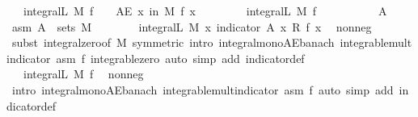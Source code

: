 \begin{isabellebody}
\ \ \ {\isachardoublequoteopen}integral\isactrlsup L\ M\ f\ {\isacharequal}{\kern0pt}\ {}\ {\isasymlongleftrightarrow}\ {\isacharparenleft}{\kern0pt}AE\ x\ in\ M{\isachardot}{\kern0pt}\ f\ x\ {\isacharequal}{\kern0pt}\ {}{\isacharparenright}{\kern0pt}{\isachardoublequoteclose}\isanewline
%
\isadelimproof
%
\endisadelimproof
%
\isatagproof
{}\isamarkupfalse%
\ \isanewline
\ \ \isamarkupfalse%
\ {\isacharasterisk}{\kern0pt}{\isacharcolon}{\kern0pt}\ {\isachardoublequoteopen}integral\isactrlsup L\ M\ f\ {\isacharequal}{\kern0pt}\ {}{\isachardoublequoteclose}\isanewline
\ \ \isacommand{{\isacharbraceleft}{\kern0pt}}\isamarkupfalse%
\isanewline
\ \ \ \ \isamarkupfalse%
\ A\ \isamarkupfalse%
\ asm{\isacharcolon}{\kern0pt}\ {\isachardoublequoteopen}A\ {\isasymin}\ sets\ M{\isachardoublequoteclose}\isanewline
\ \ \ \ \isamarkupfalse%
\ {\isachardoublequoteopen}{}\ {\isasymle}\ integral\isactrlsup L\ M\ {\isacharparenleft}{\kern0pt}{\isasymlambda}x{\isachardot}{\kern0pt}\ indicator\ A\ x\ {\isacharasterisk}{\kern0pt}\isactrlsub R\ f\ x{\isacharparenright}{\kern0pt}{\isachardoublequoteclose}\ \isamarkupfalse%
\ nonneg\ \isamarkupfalse%
\ {\isacharparenleft}{\kern0pt}subst\ integral{\isacharunderscore}{\kern0pt}zero{\isacharbrackleft}{\kern0pt}of\ M{\isacharcomma}{\kern0pt}\ symmetric{\isacharbrackright}{\kern0pt}{\isacharcomma}{\kern0pt}\ intro\ integral{\isacharunderscore}{\kern0pt}mono{\isacharunderscore}{\kern0pt}AE{\isacharunderscore}{\kern0pt}banach\ integrable{\isacharunderscore}{\kern0pt}mult{\isacharunderscore}{\kern0pt}indicator\ asm\ f\ integrable{\isacharunderscore}{\kern0pt}zero{\isacharcomma}{\kern0pt}\ auto\ simp\ add{\isacharcolon}{\kern0pt}\ indicator{\isacharunderscore}{\kern0pt}def{\isacharparenright}{\kern0pt}\isanewline
\ \ \ \ \isamarkupfalse%
\ \isamarkupfalse%
\ {\isachardoublequoteopen}{\isachardot}{\kern0pt}{\isachardot}{\kern0pt}{\isachardot}{\kern0pt}\ {\isasymle}\ integral\isactrlsup L\ M\ f{\isachardoublequoteclose}\ \isamarkupfalse%
\ nonneg\ \isamarkupfalse%
\ {\isacharparenleft}{\kern0pt}intro\ integral{\isacharunderscore}{\kern0pt}mono{\isacharunderscore}{\kern0pt}AE{\isacharunderscore}{\kern0pt}banach\ integrable{\isacharunderscore}{\kern0pt}mult{\isacharunderscore}{\kern0pt}indicator\ asm\ f{\isacharcomma}{\kern0pt}\ auto\ simp\ add{\isacharcolon}{\kern0pt}\ indicator{\isacharunderscore}{\kern0pt}def{\isacharparenright}{\kern0pt}\isanewline

\end{isabellebody}
